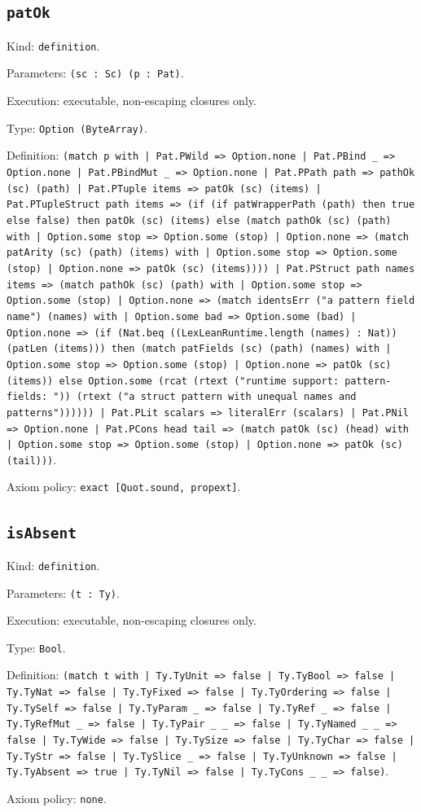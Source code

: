 \documentclass[11pt]{article}
\begin{document}
\subsection*{\texttt{patOk}}
\noindent Kind: \texttt{definition}.\par
\noindent Parameters: \texttt{(sc : Sc) (p : Pat)}.\par
\noindent Execution: executable, non-escaping closures only.\par
\noindent Type: \texttt{Option (ByteArray)}.\par
\noindent Definition: \texttt{(match p with | Pat.PWild => Option.none | Pat.PBind \_ => Option.none | Pat.PBindMut \_ => Option.none | Pat.PPath path => pathOk (sc) (path) | Pat.PTuple items => patOk (sc) (items) | Pat.PTupleStruct path items => (if (if patWrapperPath (path) then true else false) then patOk (sc) (items) else (match pathOk (sc) (path) with | Option.some stop => Option.some (stop) | Option.none => (match patArity (sc) (path) (items) with | Option.some stop => Option.some (stop) | Option.none => patOk (sc) (items)))) | Pat.PStruct path names items => (match pathOk (sc) (path) with | Option.some stop => Option.some (stop) | Option.none => (match identsErr ("a pattern field name") (names) with | Option.some bad => Option.some (bad) | Option.none => (if (Nat.beq ((LexLeanRuntime.length (names) : Nat)) (patLen (items))) then (match patFields (sc) (path) (names) with | Option.some stop => Option.some (stop) | Option.none => patOk (sc) (items)) else Option.some (rcat (rtext ("runtime support: pattern-fields: ")) (rtext ("a struct pattern with unequal names and patterns")))))) | Pat.PLit scalars => literalErr (scalars) | Pat.PNil => Option.none | Pat.PCons head tail => (match patOk (sc) (head) with | Option.some stop => Option.some (stop) | Option.none => patOk (sc) (tail)))}.\par
\noindent Axiom policy: \texttt{exact [Quot.sound, propext]}.\par
\subsection*{\texttt{isAbsent}}
\noindent Kind: \texttt{definition}.\par
\noindent Parameters: \texttt{(t : Ty)}.\par
\noindent Execution: executable, non-escaping closures only.\par
\noindent Type: \texttt{Bool}.\par
\noindent Definition: \texttt{(match t with | Ty.TyUnit => false | Ty.TyBool => false | Ty.TyNat => false | Ty.TyFixed => false | Ty.TyOrdering => false | Ty.TySelf => false | Ty.TyParam \_ => false | Ty.TyRef \_ => false | Ty.TyRefMut \_ => false | Ty.TyPair \_ \_ => false | Ty.TyNamed \_ \_ => false | Ty.TyWide => false | Ty.TySize => false | Ty.TyChar => false | Ty.TyStr => false | Ty.TySlice \_ => false | Ty.TyUnknown => false | Ty.TyAbsent => true | Ty.TyNil => false | Ty.TyCons \_ \_ => false)}.\par
\noindent Axiom policy: \texttt{none}.\par
\end{document}
